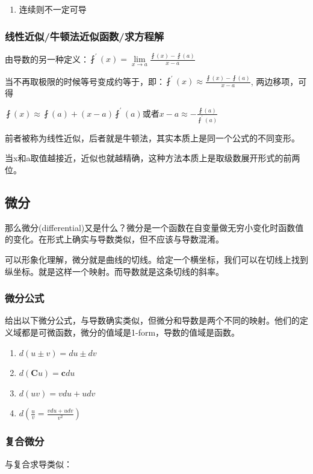 \documentclass[UTF8]{ctexbook}
\newcommand{\limNormal}[1]{\lim\limits_{#1}}
\newcommand{\derivative}{^\prime}
\newcommand{\fDerivative}[1]{\fint\derivative(#1)}
\newcommand{\defFunction}[1]{\fint(#1)}
\begin{document}
{{{\begin{enumerate}
    \item 连续则不一定可导
  \end{enumerate}

  \subsubsection{线性近似/牛顿法近似函数/求方程解}{
    由导数的另一种定义：$\fDerivative{x} = \limNormal{x \to a}\frac{\defFunction{x} - \defFunction{a}}{x - a}$

    当不再取极限的时候等号变成约等于，即：$\fDerivative{x} \approx \frac{\defFunction{x} - \defFunction{a}}{x - a}$, 两边移项，可得

    $\defFunction{x} \approx \defFunction{a} + (x-a)\fDerivative{a}$或者$x - a \approx -\frac{\defFunction{a}}{\fDerivative{a}}$

    前者被称为线性近似，后者就是牛顿法，其实本质上是同一个公式的不同变形。

    当x和a取值越接近，近似也就越精确，这种方法本质上是取级数展开形式的前两位。

  }%
}%

\subsection{微分}{
那么微分(differential)又是什么？微分是一个函数在自变量做无穷小变化时函数值的变化。在形式上确实与导数类似，但不应该与导数混淆。

可以形象化理解，微分就是曲线的切线。给定一个横坐标，我们可以在切线上找到纵坐标。就是这样一个映射。而导数就是这条切线的斜率。

\subsubsection{微分公式}{
  给出以下微分公式，与导数确实类似，但微分和导数是两个不同的映射。他们的定义域都是可微函数，微分的值域是1-form，导数的值域是函数。
  \begin{enumerate}
    \item $d(u \pm v) = du \pm dv$
    \item $d(\mathbf{C}u) = \mathbf{c}du$
    \item $d(uv) = vdu + udv$
    \item $d(\frac{u}{v} = \frac{vdu + udv}{v^2})$
  \end{enumerate}
}%

\subsubsection{复合微分}{
  与复合求导类似：

}}}}
\end{document}

